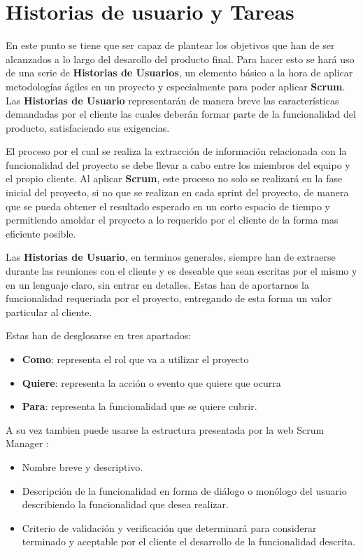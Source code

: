 \section{Historias de usuario y Tareas} \label{sec:historias-tareas}


En este punto se tiene que ser capaz de plantear los objetivos que han de ser alcanzados a lo largo del desarollo del producto final. Para hacer esto se hará uso de una serie de \textbf{Historias de Usuarios}, un elemento básico a la hora de aplicar metodologías ágiles en un proyecto y especialmente para poder aplicar \textbf{Scrum}. Las \textbf{Historias de Usuario} representarán de manera breve las características demandadas por el cliente las cuales deberán formar parte de la funcionalidad del producto, satisfaciendo sus exigencias.

El proceso por el cual se realiza la extracción de información relacionada con la funcionalidad del proyecto se debe llevar a cabo entre los miembros del equipo y el propio cliente. Al aplicar \textbf{Scrum}, este proceso no solo se realizará en la fase inicial del proyecto, si no que se realizan en cada sprint del proyecto, de manera que se pueda obtener el resultado esperado en un corto espacio de tiempo y permitiendo amoldar el proyecto a lo requerido por el cliente de la forma mas eficiente posible.

Las \textbf{Historias de Usuario}, en terminos generales, siempre han de extraerse durante las reuniones con el cliente y es deseable que sean escritas por el mismo y en un lenguaje claro, sin entrar en detalles. Estas han de aportarnos la funcionalidad requeriada por el proyecto, entregando de esta forma un valor particular al cliente.

Estas han de desglosarse en tres apartados:

\begin{itemize}
	\item \textbf{Como}: representa el rol que va a utilizar el proyecto
	\item \textbf{Quiere}: representa la acción o evento que quiere que ocurra
	\item \textbf{Para}: representa la funcionalidad que se quiere cubrir.
\end{itemize}

A su vez tambien puede usarse la estructura presentada por la web Scrum Manager \cite{scrum-manager}:

\begin{itemize}
	\item Nombre breve y descriptivo.
	\item Descripción de la funcionalidad en forma de diálogo o monólogo del usuario describiendo la funcionalidad que desea realizar.
	\item Criterio de validación y verificación que determinará para considerar terminado y aceptable por el cliente el desarrollo de la funcionalidad descrita.
\end{itemize}

